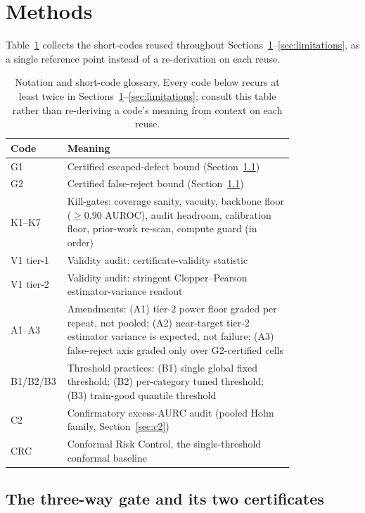 \documentclass[11pt]{article}
\begin{document}
\section{Methods}
\label{sec:methods}

Table~\ref{tab:glossary} collects the short-codes reused throughout
Sections~\ref{sec:methods}--\ref{sec:limitations}, as a single reference point instead of a
re-derivation on each reuse.

\begin{table}[t]
  \centering
  \footnotesize
  \caption{Notation and short-code glossary. Every code below recurs at least twice in
  Sections~\ref{sec:methods}--\ref{sec:limitations}; consult this table rather than re-deriving a
  code's meaning from context on each reuse.}
  \label{tab:glossary}
  {\renewcommand{\arraystretch}{0.88}
  \begin{tabular}{@{}l >{\raggedright\arraybackslash}p{0.80\linewidth}@{}}
    \toprule
    Code & Meaning \\
    \midrule
    G1 & Certified escaped-defect bound (Section~\ref{sec:gate}) \\
    G2 & Certified false-reject bound (Section~\ref{sec:gate}) \\
    K1--K7 & Kill-gates: coverage sanity, vacuity, backbone floor ($\ge 0.90$ AUROC), audit
      headroom, calibration floor, prior-work re-scan, compute guard (in order) \\
    V1 tier-1 & Validity audit: certificate-validity statistic \\
    V1 tier-2 & Validity audit: stringent Clopper--Pearson estimator-variance readout \\
    A1--A3 & Amendments: (A1) tier-2 power floor graded per repeat, not pooled; (A2) near-target
      tier-2 estimator variance is expected, not failure; (A3) false-reject axis graded only over
      G2-certified cells \\
    B1/B2/B3 & Threshold practices: (B1) single global fixed threshold; (B2) per-category tuned
      threshold; (B3) train-good quantile threshold \\
    C2 & Confirmatory excess-AURC audit (pooled Holm family, Section~\ref{sec:c2}) \\
    CRC & Conformal Risk Control, the single-threshold conformal baseline \\
    \bottomrule
  \end{tabular}}
\end{table}
\FloatBarrier

\subsection{The three-way gate and its two certificates}
\label{sec:gate}
\end{document}
